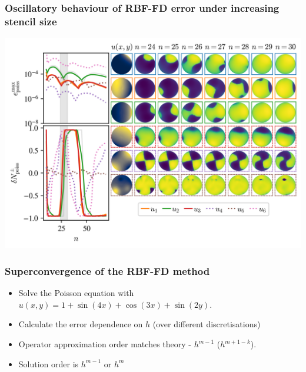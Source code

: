 \documentclass{beamer}
\begin{document}
\begin{frame}
\frametitle{Oscillatory behaviour of RBF-FD error under increasing stencil size}
\includegraphics[width=.8\linewidth,center]{Figures/DifferentFunctions.png}
\end{frame}


\begin{frame}
\frametitle{Superconvergence of the RBF-FD method}
\begin{itemize}
\item<1-> Solve the Poisson equation with $u(x,y) = 1 + \sin(4x) + \cos(3x) + \sin(2y)$.
\item<2-> Calculate the error dependence on $h$ (over different discretisations)
\item<3-> Operator approximation order matches theory - $h^{m-1}$ ($h^{m+1-k}$).
\item<3-> Solution order is $h^{m-1}$ or $h^m$
\end{itemize}
\end{frame}
\end{document}
